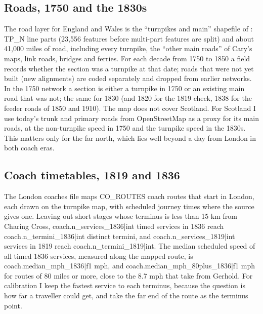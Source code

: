 \subsection{Roads, 1750 and the 1830s}
The road layer for England and Wales is the ``turnpikes and main'' shapefile of \citet{rosevear2023tp}: {{TP_N}} line parts (23,556 features before multi-part features are split) and about 41,000 miles of road, including every turnpike, the ``other main roads'' of Cary's maps, link roads, bridges and ferries. For each decade from 1750 to 1850 a field records whether the section was a turnpike at that date; roads that were not yet built (new alignments) are coded separately and dropped from earlier networks. In the 1750 network a section is either a turnpike in 1750 or an existing main road that was not; the same for 1830 (and 1820 for the 1819 check, 1838 for the feeder roads of 1850 and 1910). The map does not cover Scotland. For Scotland I use today's trunk and primary roads from OpenStreetMap as a proxy for its main roads, at the non-turnpike speed in 1750 and the turnpike speed in the 1830s. This matters only for the far north, which lies well beyond a day from London in both coach eras.

\subsection{Coach timetables, 1819 and 1836}
The London coaches file \citep{rosevear2023coach} maps {{CO_ROUTES}} coach routes that start in London, each drawn on the turnpike map, with scheduled journey times where the source gives one. Leaving out short stages whose terminus is less than 15 km from Charing Cross, {{coach.n_services_1836|int}} timed services in 1836 reach {{coach.n_termini_1836|int}} distinct termini, and {{coach.n_services_1819|int}} services in 1819 reach {{coach.n_termini_1819|int}}. The median scheduled speed of all timed 1836 services, measured along the mapped route, is {{coach.median_mph_1836|f1}} mph, and {{coach.median_mph_80plus_1836|f1}} mph for routes of 80 miles or more, close to the 8.7 mph that \citet{alvarez2017} take from Gerhold. For calibration I keep the fastest service to each terminus, because the question is how far a traveller could get, and take the far end of the route as the terminus point.

